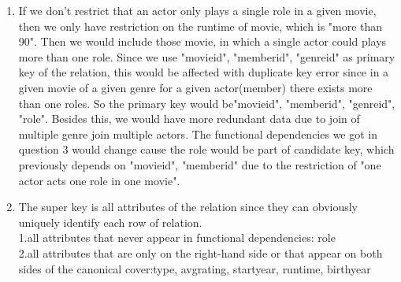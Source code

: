\documentclass[a4paper]{article}
\begin{document}
\begin{enumerate}
{\\
Program finish in 86 seconds\\
\\
Process finished with exit code 0\\
}\\
Several examples of functional dependencies that is pruned are shown below:
$[avgrating, memberid]\rightarrow birthyear$\\
$[birthyear, id]\rightarrow memberid$\\
$[birthyear, movieid]\rightarrow avgrating$\\
$[movieid, memberid]\rightarrow avgrating$\\



\item
If we don't restrict that an actor only plays a single role in a given movie, then we only have restriction on the runtime of movie, which is "more than 90". Then we would include those movie, in which a single actor could plays more than one role. Since we use {"movieid", "memberid", "genreid"} as primary key of the relation, this would be affected with duplicate key error since in a given movie of a given genre for a given actor(member) there exists more than one roles. So the primary key would be{"movieid", "memberid", "genreid", "role"}. Besides this, we would have more redundant data due to join of multiple genre join multiple actors. The functional dependencies we got in question 3 would change cause the role would be part of candidate key, which previously depends on {"movieid", "memberid"} due to the restriction of "one actor acts one role in one movie".




\item
The super key is all attributes of the relation since they can obviously uniquely identify each row of relation.\\
1.all attributes that never appear in functional dependencies: {role}\\
2.all attributes that are only on the right-hand side or that appear on both sides of the canonical cover:{type, avgrating, startyear, runtime, birthyear}


\end{enumerate}
\end{document}
